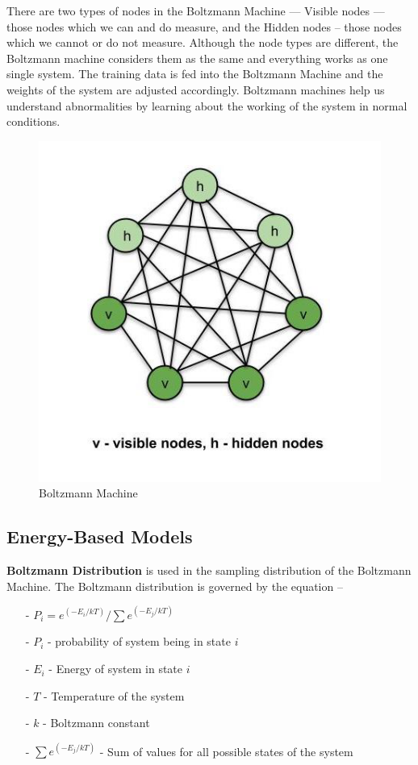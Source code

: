 There are two types of nodes in the Boltzmann Machine — Visible nodes — those nodes 
which we can and do measure, and the Hidden nodes – those nodes which we cannot or 
do not measure. Although the node types are different, the Boltzmann machine 
considers them as the same and everything works as one single system. The training 
data is fed into the Boltzmann Machine and the weights of the system are adjusted 
accordingly. Boltzmann machines help us understand abnormalities by learning about 
the working of the system in normal conditions.

\begin{figure}[H]
\centering
\includegraphics[scale=0.382]{pix/Boltzmann/Boltzmannmachine.jpg}
\caption{Boltzmann Machine}
\label{fig:Boltzmann_Machine}
\end{figure}


\subsection{Energy-Based Models}

{\bf Boltzmann Distribution} is used in the sampling distribution of the Boltzmann 
Machine. The Boltzmann distribution is governed by the equation –
\begin{itemize}
\setlength{\parskip}{0pt}
\item[-]
$P_i = e^{(-E_i/kT)} / \sum e^{(-E_j/kT)}$

\item[-]
$P_i$ - probability of system being in state $i$

\item[-]
$E_i$ - Energy of system in state $i$

\item[-]
$T$ - Temperature of the system

\item[-]
$k$ - Boltzmann constant

\item[-]
$\sum e^{(-E_j/kT)}$ - Sum of values for all possible states of the system 
\end{itemize}

